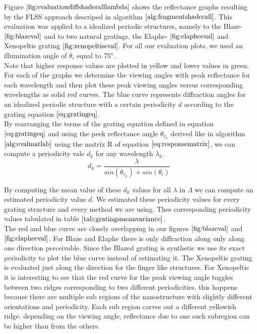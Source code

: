 Figure $\ref{fig:evaluationdiffshaderalllambda}$ shows the reflectance graphs resulting by the FLSS approach descriped in algorithm $\ref{alg:fragmentshaderall}$. This evaluation was applied to a idealized periodic structures, namely to the Blaze- $\ref{fig:blazeval}$ and to two natural gratings, the Elaphe- $\ref{fig:elapheeval}$ and Xenopeltis grating $\ref{fig:xenopeltiseval}$. For all our evaluation plots, we used an illumination angle of $\theta_i$ equal to $75\degree$. \\

Note that higher response values are plotted in yellow and lower values in green. For each of the graphs we determine the viewing angles with peak reflectance for each wavelength and then plot these peak viewing angles versus corresponding wavelengths as solid red curves. The blue curve represents diffraction angles for an idealized periodic structure with a certain periodicity $d$ according to the grating equation $\ref{eq:gratingeq}$. \\

By rearranging the terms of the grating equation defined in equation $\ref{eq:gratingeq}$ and using the peek reflectance angle $\theta_{r_k}$ derived like in algorithm $\ref{alg:evalmatlab}$ using the matrix R of equation $\ref{eq:responsematrix}$, we can compute a periodicity vale $d_k$ for any wavelength $\lambda_k$.  
\begin{equation}
  d_k = \frac{\lambda}{sin(\theta_{r_k}) + sin(\theta_i)}
\end{equation}

By computing the mean value of these $d_k$ values for all $\lambda$ in $\Lambda$ we can compute an estimated periodicity value $d$. We estimated these periodicity values for every grating structure and every method we are using. Thes corresponding periodicity values tabulated in table $\ref{tab:gratingsmeanvariance}$. \\

The red and blue curve are closely overlapping in our figures $\ref{fig:blazeval}$ and $\ref{fig:elapheeval}$. For Blaze and Elaphe there is only diffraction along only along one direction perceivable. Since the Blazed grating is synthetic we use its exact periodicity to plot the blue curve instead of estimating it. The Xenopeltis grating is evaluated just along the direction for the finger like structures. For Xenopeltis it is interesting to see that the red curve for the peak viewing angle toggles between two ridges corresponding to two different periodicities. this happens because there are multiple sub regions of the nanostructure with slightly different orientations and periodicity. Each sub region carves out a different yellowish ridge. depending on the viewing angle, reflectance due to one such subregion can be higher than from the others. \\

